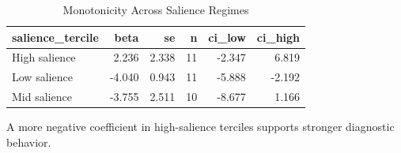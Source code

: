 \begin{table}[!htbp]
\centering
\caption{Monotonicity Across Salience Regimes}
\label{tab:heterogeneity_monotonicity}
\begin{threeparttable}

\begin{tabular}{lrrrrr}
\toprule
salience\_tercile & beta & se & n & ci\_low & ci\_high\\
\midrule
High salience & 2.236 & 2.338 & 11 & -2.347 & 6.819\\
Low salience & -4.040 & 0.943 & 11 & -5.888 & -2.192\\
Mid salience & -3.755 & 2.511 & 10 & -8.677 & 1.166\\
\bottomrule
\end{tabular}
\begin{tablenotes}[flushleft]
\footnotesize
\item A more negative coefficient in high-salience terciles supports stronger diagnostic behavior.
\end{tablenotes}
\end{threeparttable}
\end{table}
